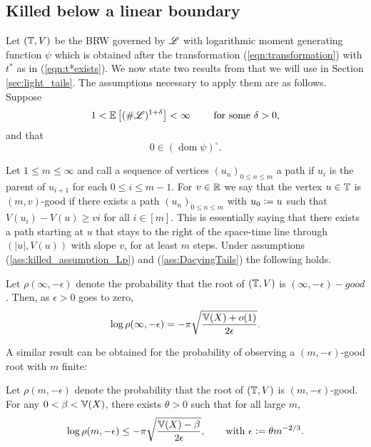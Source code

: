 \subsection{Killed below a linear boundary}

Let $(\mathbb{T}, V)$ be the BRW governed by $\mathscr{L}$ with logarithmic moment generating function $\psi$ which is obtained after the transformation (\ref{eqn:transformation}) with $t^*$ as in (\ref{eqn:t*exists}). We now state two results from \cite{gantert2008asymptotics} that we will use in Section \ref{sec:light_tails}. The assumptions necessary to apply them are as follows. Suppose 
\begin{equation}\label{ass:killed_assumption_Lp}
1 < \mathbb{E}\left[ (\# \mathscr{L})^{1 + \delta} \right] < \infty\qquad\text{ for some } \delta > 0, 
\end{equation}
and that 
\begin{equation}\label{ass:DacyingTails}
0 \in (\operatorname*{dom} \psi)^\circ. 
\end{equation}

Let $1 \leq m \leq \infty$ and call a sequence of vertices $(u_n)_{0 \leq n \leq m}$ a path if $u_i$ is the parent of $u_{i+1}$ for each $0 \leq i \leq m-1$. For $v \in \mathbb{R}$ we say that the vertex $u \in \mathbb{T}$ is $(m, v)$-good if there exists a path $(u_n)_{0 \leq n \leq m}$ with $u_0 \vcentcolon= u$ such that $V(u_i) - V(u) \geq vi$ for all $i \in [m]$. This is essentially saying that there exists a path starting at $u$ that stays to the right of the space-time line through $(|u|, V(u))$ with slope $v$, for at least $m$ steps. Under assumptions (\ref{ass:killed_assumption_Lp}) and (\ref{ass:DacyingTails}) the following holds. 
\begin{theorem}\label{thm:infty_good}
Let $\rho(\infty, - \epsilon)$ denote the probability that the root of $(\mathbb{T}, V)$ is $(\infty, - \epsilon)-good$. Then, as $\epsilon > 0$ goes to zero, 
\begin{equation}\nonumber
\log\rho(\infty, - \epsilon) = - \pi \sqrt{\frac{\mathbb{V}(X) + o(1)}{2 \epsilon}}. 
\end{equation}
\end{theorem}

A similar result can be obtained for the probability of observing a $(m, - \epsilon)$-good root with $m$ finite:
\begin{theorem}\label{thm:finite_good}
Let $\rho(m, - \epsilon)$ denote the probability that the root of $(\mathbb{T}, V)$ is $(m, - \epsilon)$-good. For any $0 < \beta < \mathbb{V}(X)$, there exists $\theta > 0$ such that for all large $m$, 
\begin{equation}\nonumber
\log \rho(m, - \epsilon) \leq - \pi \sqrt{\frac{\mathbb{V}(X) - \beta}{2 \epsilon}}, \qquad \text{with } \epsilon \vcentcolon= \theta m^{-2/3}. 
\end{equation}
\end{theorem}

\newpage